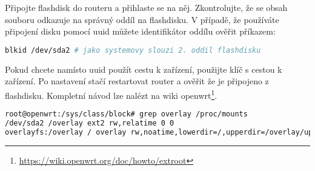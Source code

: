 Připojte flashdisk do routeru a přihlaste se na něj. Zkontrolujte, že se
obsah souboru  odkazuje na správný oddíl na flashdisku.
V případě, že používáte připojení disku pomocí \gls{uuid} můžete identifikátor
oddílu ověřit příkazem:
\begin{lstlisting}[language=sh]
blkid /dev/sda2 # jako systemovy slouzi 2. oddil flashdisku
\end{lstlisting}
Pokud chcete namísto \gls{uuid} použít cestu k zařízení, použijte klíč
 s cestou k zařízení. Po nastavení stačí restartovat router a
ověřit že je  připojeno z flashdisku. Kompletní návod lze
nalézt na wiki \gls{openwrt}\footnote{\url{https://wiki.openwrt.org/doc/howto/extroot}}.
\begin{lstlisting}[language=sh]
root@openwrt:/sys/class/block# grep overlay /proc/mounts
/dev/sda2 /overlay ext2 rw,relatime 0 0
overlayfs:/overlay / overlay rw,noatime,lowerdir=/,upperdir=/overlay/upper,workdir=/overlay/work 0 0
\end{lstlisting}
